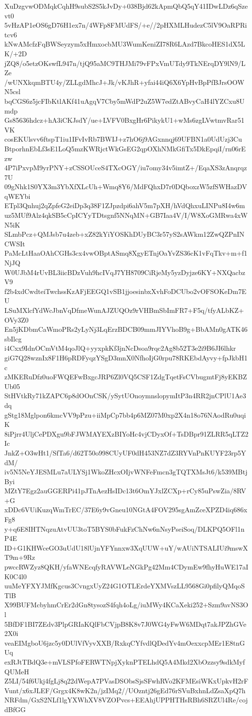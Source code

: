 XuDzgvwODMqkCqhH9subS2S5kJvDy+038Bjd62kApmQbQ5qY41IDwLDz6qSzevt0
5vHzAP1eOS6gD76H1ex7n/4WFp8FMUdFS/+e//2pHXMLHudezC5lV9OaRPRitcv6
kNwAMcfzFqBWSeyzym5xHmxocbMU3WumKeniZI78R6LAzd7BkcoHES1dX5LK/+2D
jZQ8/o5etzOKswfL947n/tjQ95aMC9THJMi79vFPxVmUTdy9TkNErqDY9lN9/LZe
/wUNXkqmBTU4y/ZLLgdMhcJ+Jk/vKJhR+yfai44iQ6X6YpHvBpPfBJrsOOWN5csl
bqCGS6z5jcFIbKtlAKf41uAgqV7Cby5mWdP2uZ5W7edZtABvyCaH4lYZCxu8Umdp
Gs85636hdcz+hA3iCKJsdY/ue+LVFV0BxgHr6PikykU1+wMs6zgLVwtmvRar51VK
cosEKUlsvv6ftspT1iu1IFvIvRb7BWIJ+z7hO6j9AGxnnqj69UFBN1a0UdUzj3Cu
BtporhnEbLf3sE1LoQ5mzKWRjctWkGsEG2qpOXhNMkGfiTx5DkEpqiI/rn06rEzw
4P7iPxvpM9yrPNY+zCSSOUceS4TXcOGY/iu7omy34v5imtZ+/EqaXS3zAnqrqz7U
09gNhk1S0YX3m3YbXfXLcUh+Wmq8Y6/MdFQhxD7r0DQboxzW5zfSWHazDVqWEYbi
ETpl3Qnhuj2qZpfeG2eiDp3q38F1ZJpzdpi6ahV5m7pXH/hVdQhxuLINPu8I4w6m
uz5MUf9Alz4qkSB5cCpICYyTDtsgnf5NNqMN+GB7Iaa4V/I/W8XoGMRwa4xWN5iK
SLmbPcz+QMJsb7u4zeb+xZ82kYiYOSKhDUyBC3r57yS2sAWkm12ZwQZPnINCWSIt
PaMcLtHaaOAhCGHs3cx4vwOBptASmq8XgyETnjOaYvZS36cK1vFqTkv+m+f1NjJQ
W0UJbM4rUvBL3iicBDzVuh9hcIVqJ7YH8709CiRjeMy5yzDyjze6KY+NXQacbzV9
f2b4xdCwdteiTwchssKzAFjEEGQ1vSB1jjoesinbxXvhFoDCUbo2vOFSOKeDm7EU
LSuMXlcfYdWcJbnVqDfmeWunAJZUQOz9rVHBmSbImFR7+F5q/tfyALbKZ+OVy3Z0
En5jKDbmCaWmoPRs2yLyNj3LqErzBDCB09mmJIYVhoB9g+BbAMn0gATK46sbIlcg
i4Cxx9IdnOCmVtM4qoJlQ+yyxpkKf3jnNcDsoa9rqc2Ag8b52T3e2i9B6JI6lhkr
giG7Q28wznIx8F1H6pRDFyqzYSgD3mnX0NfhoIjG0rpu78RKEbdAyvy+fpJkbH1c
zMKERuDfz0uoFWQEFwBxgcJRP6Zl0VQ5CSF1ZdgTqetFsCVbugmtFj8yEKBZUb05
StHVtkRy71kZAPC6p8dOOnCSK/ySytUOnoymnslopymItP3n4RR2jnCPlU1Ae3dq
gStg18Mglpon6kmcVV9pPzu+iiMpCp7bb4p6MZ07M0xp2X4n18o76NAodRu0uqiK
8iPjrr4UljCePDXgu9bFJWMAYEXzBIYoHc4vjCDyxOf+TsDBpr91ZLRR5qLTZ2Ic
JnkZ+O3wHt1/SfTa6/d62T50o998CUyUF0dH453NZ7dZ3RYVnPnKUYF23rp5YdM/
iv5N5NeYJESMLu7aULYSj1WkoZHcxOIjvWNFeFmcn3gTQTXMsJt6/k539MBtjByi
MZtY7Egz2auGGERPi41pJTnAezHsIDc13t6OmYJxlZCXp+rCy85uPswZia/8RV+G
xDDc6VUiKuzqWmTrEC/37E6y9vGneu10NGtA4FOV295sgAmZceXPZD4iq686xFg8
y+q6E8IHTNqzuAtvUU3toT5BYS0bFukFzChNw6nNsyPseiSoq/DLKPQ5OFl1nP4E
ID+G1KHWceGO3uUdU18lUjnYFYnnxw3XqUUW+uY/wAUiNTSALIUi9mswXT9m+9Rz
pwccRWZyz8QKH/yfaWNEcqfyRAVWLeNGkPg42Mm4CDymEw9fhyHuWE17aIK0C4l0
uuMeYFXYJMfKgcus3CvngxUyZ24G1OTLErdeYXMVszLL9568Gi0pfilyQMqoSTlB
X99BUFMcbyhmCrEr2dGn8tysozS4fqh4oLg/iuMWy4KCaXeki252+Szm9avNS3Ol
5BfDF1BI7ZEdv3PlpGRIaKQlFbCVjpB8K8v7J0WG4yFwW6MDqt7akJPZhGVe2X0i
veaEIMgboU6jzc5y0DUlVfVyvXXB/RxkqCYfvdlQDedYv4mOexxcpMEr1E8tnGUq
exRJtTBdQ3e+mVLSPfoFERWTNpjXyknPTELhdQ5A4Mkd2XbOzzsy9sdkMyfQUMeH
Z5LI/54f6Ukj4fgLj8q22dWepA7PVasDSObsSjsSFwhRVo2KFMEsiWKxUpkvH2rF
Vunt/x6xJLEF/Grgx4K8wK2n/jzIMq2//UOzntj26gEd76rSVuBxhnLdZsaXpQ7h
NRFdm/GxS2NLf1lgYXWhXV8VZOPvcs+EEAhjUPPHTHsRBh6SRZUl4Re/cojdBfGG

